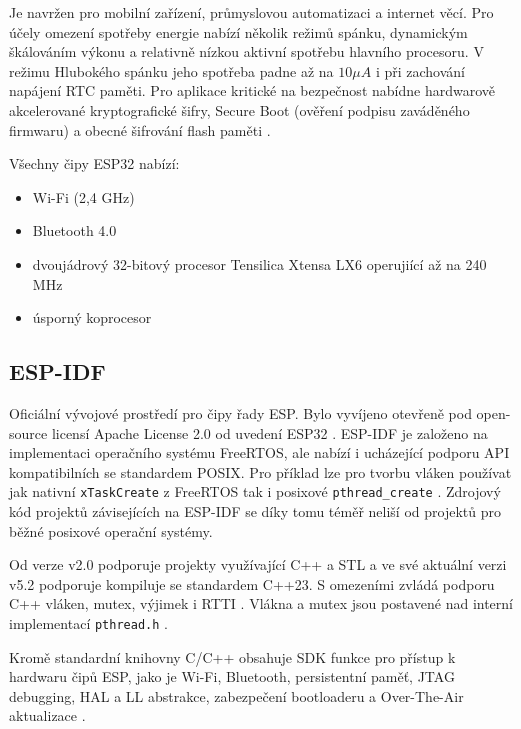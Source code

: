 Je navržen pro mobilní zařízení, průmyslovou automatizaci a internet věcí. Pro účely omezení spotřeby energie nabízí několik režimů spánku, dynamickým škálováním výkonu a relativně nízkou aktivní spotřebu hlavního procesoru. V režimu Hlubokého spánku jeho spotřeba padne až na $10 \mu A$ i při zachování napájení RTC paměti. Pro aplikace kritické na bezpečnost nabídne hardwarově akcelerované kryptografické šifry, Secure Boot (ověření podpisu zaváděného firmwaru) a obecné šifrování flash paměti \cite{esp32_datasheet}. 

Všechny čipy ESP32 nabízí\cite{espressifProductOverviewESP32}:
\begin{itemize}
    \item Wi-Fi (2,4 GHz)
    \item Bluetooth 4.0
    \item dvoujádrový 32-bitový procesor Tensilica Xtensa LX6 operujiící až na 240 MHz
    \item úsporný koprocesor
\end{itemize}

\subsection{ESP-IDF}
Oficiální vývojové prostředí pro čipy řady ESP. Bylo vyvíjeno otevřeně pod open-source licensí Apache License 2.0 od uvedení ESP32 \cite{grokhotkovInitialPublicVersion2016}. ESP-IDF je založeno na implementaci operačního systému FreeRTOS, ale nabízí i ucházející podporu API kompatibilních se standardem POSIX. Pro příklad lze pro tvorbu vláken používat jak nativní \verb|xTaskCreate| z FreeRTOS tak i posixové \verb|pthread_create| \cite{espressifPOSIXThreadsSupport}. Zdrojový kód projektů závisejících na ESP-IDF se díky tomu téměř neliší od projektů pro běžné posixové operační systémy.

Od verze v2.0 podporuje projekty využívající C++ a STL \cite{grokhotkovReleaseESPIDFRelease} a ve své aktuální verzi v5.2 podporuje kompiluje se standardem C++23. S omezeními zvládá podporu C++ vláken, mutex, výjimek i RTTI \cite{espressifSupportESP32ESPIDF}. Vlákna a mutex jsou postavené nad interní implementací \verb|pthread.h| \cite{espressifPOSIXThreadsSupport}.

Kromě standardní knihovny C/C++ obsahuje SDK funkce pro přístup k hardwaru čipů ESP, jako je Wi-Fi, Bluetooth, persistentní paměť, JTAG debugging, HAL a LL abstrakce, zabezpečení bootloaderu a Over-The-Air aktualizace \cite{espressifAPIGuidesESP32}.

